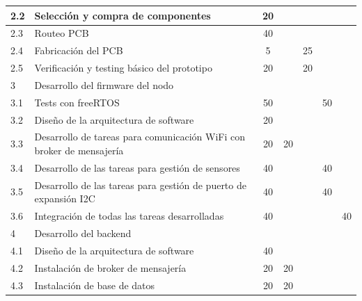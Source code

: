 \documentclass[11pt]{charter}
\begin{document}
\begin{table}[ht]
{\begin{tabular}{|l|l|c|c|c|c|c|}
2.2   & Selección y compra de componentes                                    & 20      &         &         &        &        \\ \hline
2.3   & Routeo PCB                                                           & 40      &         &         &        &        \\ \hline
2.4   & Fabricación del PCB                                                  & 5       &         & 25      &        &        \\ \hline
2.5   & Verificación y testing básico del prototipo                          & 20      &         & 20      &        &        \\ \hline
\rowcolor[HTML]{EFEFEF} 
3     & Desarrollo del firmware del nodo                                     & \multicolumn{5}{c|}{\cellcolor[HTML]{EFEFEF}} \\ \hline
3.1   & Tests con freeRTOS                                                   & 50      &         &         & 50     &        \\ \hline
3.2   & Diseño de la arquitectura de software                                & 20      &         &         &        &        \\ \hline
3.3   & Desarrollo de tareas para comunicación WiFi con broker de mensajería & 20      & 20      &         &        &        \\ \hline
3.4   & Desarrollo de las tareas para gestión de sensores                    & 40      &         &         & 40     &        \\ \hline
3.5   & Desarrollo de las tareas para gestión de puerto de expansión I2C     & 40      &         &         & 40     &        \\ \hline
3.6   & Integración de todas las tareas desarrolladas                        & 40      &         &         &        & 40     \\ \hline
\rowcolor[HTML]{EFEFEF} 
4     & Desarrollo del backend                                               & \multicolumn{5}{c|}{\cellcolor[HTML]{EFEFEF}} \\ \hline
4.1   & Diseño de la arquitectura de software                                & 40      &         &         &        &        \\ \hline
4.2   & Instalación de broker de mensajería                                  & 20      & 20      &         &        &        \\ \hline
4.3   & Instalación de base de datos                                         & 20      & 20      &         &        &        \\ \hline

\end{tabular}}
\end{table}
\end{document}
